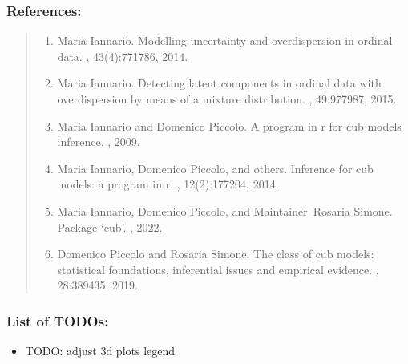 \documentclass[letterpaper,10pt,english]{sphinxmanual}
\begin{document}
\subsubsection{References:}
\label{\detokenize{cubmods:id206}}\begin{quote}
\begin{enumerate}
%
\setcounter{enumi}{0}
\item {} 
\sphinxAtStartPar
Maria Iannario. Modelling uncertainty and overdispersion in ordinal data. , 43(4):771\textendash{}786, 2014.

\item {} 
\sphinxAtStartPar
Maria Iannario. Detecting latent components in ordinal data with overdispersion by means of a mixture distribution. , 49:977\textendash{}987, 2015.

\item {} 
\sphinxAtStartPar
Maria Iannario and Domenico Piccolo. A program in r for cub models inference. , 2009.

\item {} 
\sphinxAtStartPar
Maria Iannario, Domenico Piccolo, and others. Inference for cub models: a program in r. , 12(2):177\textendash{}204, 2014.

\item {} 
\sphinxAtStartPar
Maria Iannario, Domenico Piccolo, and Maintainer Rosaria Simone. Package ‘cub’. , 2022.

\item {} 
\sphinxAtStartPar
Domenico Piccolo and Rosaria Simone. The class of cub models: statistical foundations, inferential issues and empirical evidence. , 28:389\textendash{}435, 2019.

\end{enumerate}
\end{quote}


\subsubsection{List of TODOs:}
\label{\detokenize{cubmods:id244}}\begin{itemize}
\item {} 
\sphinxAtStartPar
TODO: adjust 3d plots legend

\end{itemize}
\end{document}
